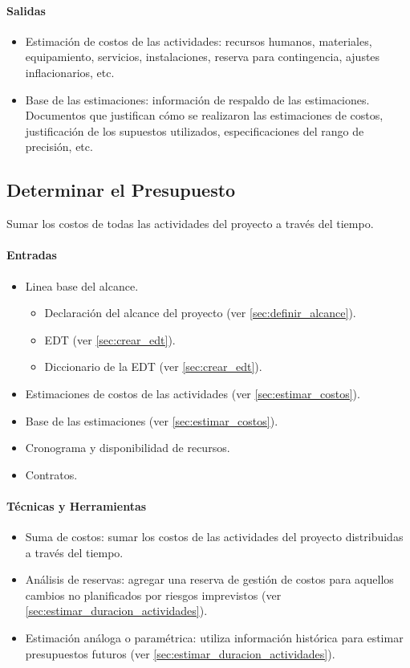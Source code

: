 \documentclass[a4paper,twosides]{article}
\newlength{\wideitemsep}
\let\olditem\item
\renewcommand{\item}{\setlength{\itemsep}{\wideitemsep}\olditem}
\begin{document}
\paragraph{Salidas}
\begin{itemize}
\item Estimación de costos de las actividades: recursos humanos, materiales, equipamiento, servicios, instalaciones, reserva para contingencia, ajustes inflacionarios, etc.
\item Base de las estimaciones: información de respaldo de las estimaciones. Documentos que justifican cómo se realizaron las estimaciones de costos, justificación de los supuestos utilizados, especificaciones del rango de precisión, etc.
\end{itemize}

\subsection{Determinar el Presupuesto} \label{sec:determinar_presupuesto}
Sumar los costos de todas las actividades del proyecto a través del tiempo.

\paragraph{Entradas}
\begin{itemize}
\item Linea base del alcance.
\begin{itemize}
\item Declaración del alcance del proyecto (ver \ref{sec:definir_alcance}).
\item EDT (ver \ref{sec:crear_edt}).
\item Diccionario de la EDT (ver \ref{sec:crear_edt}). 
\end{itemize}
\item Estimaciones de costos de las actividades (ver \ref{sec:estimar_costos}).
\item Base de las estimaciones (ver \ref{sec:estimar_costos}).
\item Cronograma y disponibilidad de recursos.
\item Contratos.
\end{itemize}

\paragraph{Técnicas y Herramientas}
\begin{itemize}
\item Suma de costos: sumar los costos de las actividades del proyecto distribuidas a través del tiempo.
\item Análisis de reservas: agregar una reserva de gestión de costos para aquellos cambios no planificados por riesgos imprevistos (ver \ref{sec:estimar_duracion_actividades}).
\item Estimación análoga o paramétrica: utiliza información histórica para estimar presupuestos futuros (ver \ref{sec:estimar_duracion_actividades}).
\end{itemize}
\end{document}
